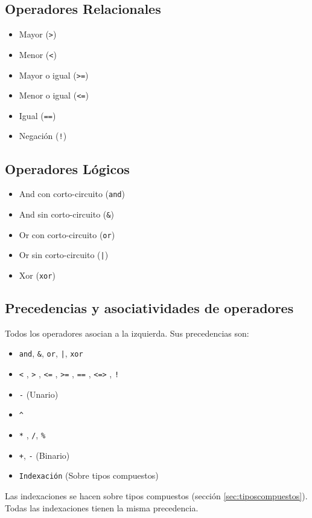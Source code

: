 \documentclass[12pt, spanish]{report}
\begin{document}
\subsection{Operadores Relacionales}
\begin{itemize}
\item Mayor         (\texttt{>})
\item Menor         (\texttt{<})
\item Mayor o igual (\texttt{>=})
\item Menor o igual (\texttt{<=})
\item Igual (\texttt{==})
\item Negaci\'on      (\texttt{!})
\end{itemize}

\subsection{Operadores L\'ogicos}
\begin{itemize}
\item And con corto-circuito (\texttt{and})
\item And sin corto-circuito (\texttt{\&})
\item Or con corto-circuito  (\texttt{or})
\item Or sin corto-circuito  (\texttt{|})
\item Xor (\texttt{xor})
\end{itemize}

\subsection{Precedencias y asociatividades de operadores}
\label{sec:basic_preced}
Todos los operadores asocian a la izquierda. Sus precedencias son:
\begin{itemize}
\item \texttt{and}, \texttt{\&}, \texttt{or}, \texttt{|}, \texttt{xor}
\item \texttt{<} , \texttt{>} , \texttt{<=} , \texttt{>=} , \texttt{==} , \texttt{<=>} , \texttt{!}
\item \texttt{-} (Unario)
\item \texttt{\^}
\item \texttt{*} ,  \texttt{/}, \texttt{\%}
\item \texttt{+}, \texttt{-} (Binario)
\item \texttt{Indexaci\'on} (Sobre tipos compuestos)
\end{itemize}
Las indexaciones se hacen sobre tipos compuestos (secci\'on \ref{sec:tiposcompuestos}).
Todas las indexaciones tienen la misma precedencia.
\end{document}
